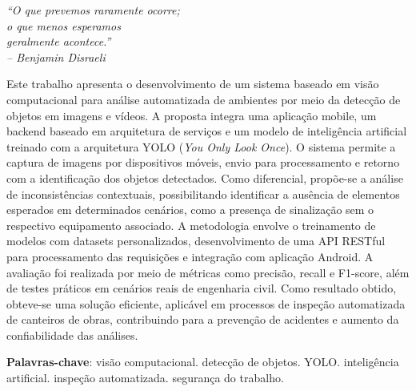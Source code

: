 \documentclass[
	12pt,				%
	openright,			%
	oneside,			%
	a4paper,			%
	chapter=TITLE,		%
	english,			%
	brazil				%
	]{abntex2}
\begin{document}
\begin{epigrafe}
    \vspace*{\fill}
	\begin{flushright}
		\textit{``O que prevemos raramente ocorre;\\
		o que menos esperamos\\
		geralmente acontece.''\\
		-- Benjamin Disraeli}
	\end{flushright}
\end{epigrafe}

\begin{resumo}
  Este trabalho apresenta o desenvolvimento de um sistema baseado em visão computacional para análise automatizada de ambientes por meio da detecção de objetos em imagens e vídeos. A proposta integra uma aplicação mobile, um backend baseado em arquitetura de serviços e um modelo de inteligência artificial treinado com a arquitetura YOLO (\textit{You Only Look Once}). O sistema permite a captura de imagens por dispositivos móveis, envio para processamento e retorno com a identificação dos objetos detectados. Como diferencial, propõe-se a análise de inconsistências contextuais, possibilitando identificar a ausência de elementos esperados em determinados cenários, como a presença de sinalização sem o respectivo equipamento associado. A metodologia envolve o treinamento de modelos com datasets personalizados, desenvolvimento de uma API RESTful para processamento das requisições e integração com aplicação Android. A avaliação foi realizada por meio de métricas como precisão, recall e F1-score, além de testes práticos em cenários reais de engenharia civil. Como resultado obtido, obteve-se uma solução eficiente, aplicável em processos de inspeção automatizada de canteiros de obras, contribuindo para a prevenção de acidentes e aumento da confiabilidade das análises.
  
  \vspace{\onelineskip}
  \noindent
  \textbf{Palavras-chave}: visão computacional. detecção de objetos. YOLO. inteligência artificial. inspeção automatizada. segurança do trabalho.
\end{resumo}
\end{document}
